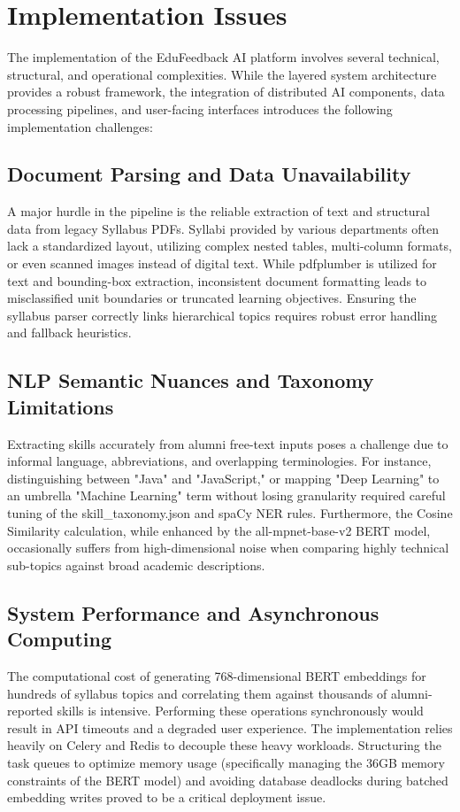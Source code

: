 \chapter{Implementation Issues}
\label{Chapter:Implementation}

The implementation of the EduFeedback AI platform involves several technical, structural, and operational complexities. While the layered system architecture provides a robust framework, the integration of distributed AI components, data processing pipelines, and user-facing interfaces introduces the following implementation challenges:

\section{Document Parsing and Data Unavailability}
A major hurdle in the pipeline is the reliable extraction of text and structural data from legacy Syllabus PDFs. Syllabi provided by various departments often lack a standardized layout, utilizing complex nested tables, multi-column formats, or even scanned images instead of digital text. While pdfplumber is utilized for text and bounding-box extraction, inconsistent document formatting leads to misclassified unit boundaries or truncated learning objectives. Ensuring the syllabus parser correctly links hierarchical topics requires robust error handling and fallback heuristics.

\section{NLP Semantic Nuances and Taxonomy Limitations}
Extracting skills accurately from alumni free-text inputs poses a challenge due to informal language, abbreviations, and overlapping terminologies. For instance, distinguishing between "Java" and "JavaScript," or mapping "Deep Learning" to an umbrella "Machine Learning" term without losing granularity required careful tuning of the skill\_taxonomy.json and spaCy NER rules. Furthermore, the Cosine Similarity calculation, while enhanced by the all-mpnet-base-v2 BERT model, occasionally suffers from high-dimensional noise when comparing highly technical sub-topics against broad academic descriptions.

\section{System Performance and Asynchronous Computing}
The computational cost of generating 768-dimensional BERT embeddings for hundreds of syllabus topics and correlating them against thousands of alumni-reported skills is intensive. Performing these operations synchronously would result in API timeouts and a degraded user experience. The implementation relies heavily on Celery and Redis to decouple these heavy workloads. Structuring the task queues to optimize memory usage (specifically managing the 36GB memory constraints of the BERT model) and avoiding database deadlocks during batched embedding writes proved to be a critical deployment issue.

